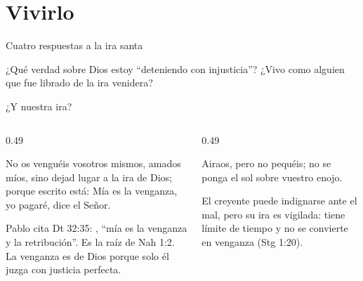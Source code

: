 \section{Vivirlo}

\begin{frame}{Cuatro respuestas a la ira santa}
\centering
{}\par\medskip
\small\RaggedRight ¿Qué verdad sobre Dios estoy ``deteniendo con injusticia''? ¿Vivo como alguien que fue librado de la ira venidera?
\end{frame}

\begin{frame}{¿Y nuestra ira?}
\begin{columns}[t,onlytextwidth]
\begin{column}{0.49\textwidth}
\begin{cita}No os venguéis vosotros mismos, amados míos, sino dejad lugar a la ira de Dios; porque escrito está: Mía es la venganza, yo pagaré, dice el Señor.\end{cita}
\scriptsize Pablo cita Dt 32:35: , ``mía es la venganza y la retribución''. Es la raíz  de Nah 1:2. La venganza es de Dios porque solo él juzga con justicia perfecta.
\end{column}
\begin{column}{0.49\textwidth}
\begin{cita}Airaos, pero no pequéis; no se ponga el sol sobre vuestro enojo.\end{cita}
\small El creyente puede indignarse ante el mal, pero su ira es vigilada: tiene límite de tiempo y no se convierte en venganza (Stg 1:20).\par\smallskip
{}
\end{column}
\end{columns}
\end{frame}

